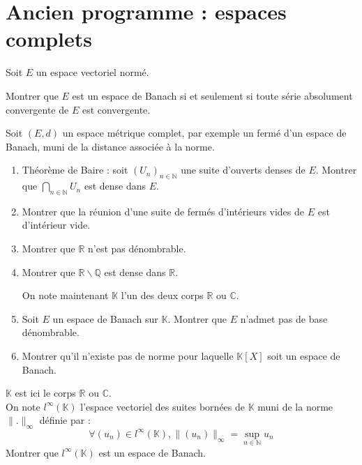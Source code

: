 \section{Ancien programme : espaces complets}

\begin{exer}
Soit $E$ un espace vectoriel normé.

Montrer que $E$ est un espace de Banach si et seulement si toute série absolument convergente de $E$ est convergente.
\end{exer}

\begin{exer}
Soit $(E,d)$ un espace métrique complet, par exemple un fermé d'un espace de Banach, muni de la distance associée à la norme.
\begin{enumerate}
\item Théorème de Baire : soit $(U_n)_{n \in \mathbb{N}}$ une suite d'ouverts denses de $E$.
Montrer que $\bigcap_{n \in \mathbb{N}}U_n$ est dense dans $E$.
\item Montrer que la réunion d'une suite de fermés d'intérieurs vides de $E$ est d'intérieur vide.
\item Montrer que $\mathbb{R}$ n'est pas dénombrable.
\item Montrer que $\mathbb{R} \backslash \mathbb{Q}$ est dense dans $\mathbb{R}$.

\medskip
On note maintenant $\mathbb{K}$ l'un des deux corps $\mathbb{R}$ ou $\mathbb{C}$.
\item Soit $E$ un espace de Banach sur $\mathbb{K}$. Montrer que $E$ n'admet pas de base dénombrable.
\item Montrer qu'il n'existe pas de norme pour laquelle $\mathbb{K}[X]$ soit un espace de Banach.
\end{enumerate}
\end{exer}

\begin{exer}
$\mathbb{K}$ est ici le corps $\mathbb{R}$ ou $\mathbb{C}$.\\
On note $l^{\infty}(\mathbb{K})$ l'espace vectoriel des suites bornées de $\mathbb{K}$ muni de la norme $\|.\|_{\infty}$ définie par :
\[\forall (u_n) \in l^{\infty}(\mathbb{K}) , \|(u_n)\|_{\infty} = \sup_{n \in \mathbb{N}} u_n\]
Montrer que $l^{\infty}(\mathbb{K})$ est un espace de Banach.
\end{exer}

